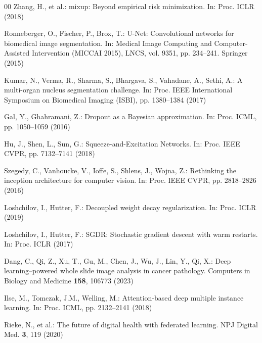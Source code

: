 \documentclass[runningheads]{llncs}
\begin{document}
\begin{thebibliography}{00}
Zhang, H., et al.: mixup: Beyond empirical risk minimization. In: Proc. ICLR (2018)

Ronneberger, O., Fischer, P., Brox, T.: U-Net: Convolutional networks for biomedical image segmentation. In: Medical Image Computing and Computer-Assisted Intervention (MICCAI 2015), LNCS, vol. 9351, pp. 234--241. Springer (2015)

Kumar, N., Verma, R., Sharma, S., Bhargava, S., Vahadane, A., Sethi, A.: A multi-organ nucleus segmentation challenge. In: Proc. IEEE International Symposium on Biomedical Imaging (ISBI), pp. 1380--1384 (2017)

Gal, Y., Ghahramani, Z.: Dropout as a Bayesian approximation. In: Proc. ICML, pp. 1050--1059 (2016)

Hu, J., Shen, L., Sun, G.: Squeeze-and-Excitation Networks. In: Proc. IEEE CVPR, pp. 7132--7141 (2018)

Szegedy, C., Vanhoucke, V., Ioffe, S., Shlens, J., Wojna, Z.: Rethinking the inception architecture for computer vision. In: Proc. IEEE CVPR, pp. 2818--2826 (2016)

Loshchilov, I., Hutter, F.: Decoupled weight decay regularization. In: Proc. ICLR (2019)

Loshchilov, I., Hutter, F.: SGDR: Stochastic gradient descent with warm restarts. In: Proc. ICLR (2017)

Dang, C., Qi, Z., Xu, T., Gu, M., Chen, J., Wu, J., Lin, Y., Qi, X.: Deep learning--powered whole slide image analysis in cancer pathology. Computers in Biology and Medicine \textbf{158}, 106773 (2023)

Ilse, M., Tomczak, J.M., Welling, M.: Attention-based deep multiple instance learning. In: Proc. ICML, pp. 2132--2141 (2018)

Rieke, N., et al.: The future of digital health with federated learning. NPJ Digital Med. \textbf{3}, 119 (2020)

\end{thebibliography}
\end{document}
